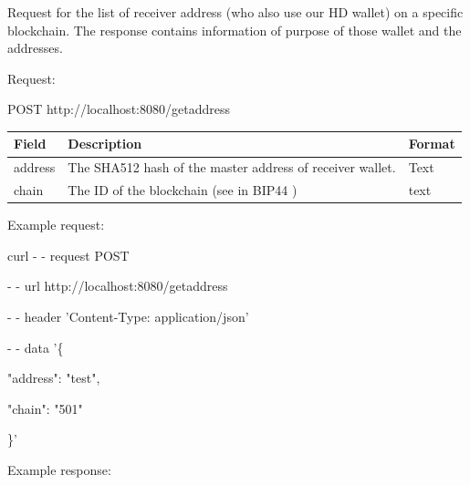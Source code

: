 Request for the list of receiver address (who also use our HD wallet) on a specific blockchain. The response contains information of purpose of those wallet and the addresses.

Request:

\begin{framed}
    POST http://localhost:8080/getaddress
\end{framed}

\begin{tabular}{| m{3cm} | m{9cm} | m{2.6cm} |}
    \hline
    Field & Description & Format                                            \\ \hline
    address & The SHA512 hash of the master address of receiver wallet. & Text   \\ \hline
    chain   & The ID of the blockchain (see in BIP44 \cite{bip44}) & text    \\ \hline
\end{tabular}
\bigskip

Example request:

\begin{framed}
\hspace*{13mm}    curl - - request POST \par
\hspace*{13mm}        - - url http://localhost:8080/getaddress \par
\hspace*{13mm}        - - header 'Content-Type: application/json' \par
\hspace*{13mm}        - - data '\{ \par
\hspace*{20mm}                "address": "test", \par
\hspace*{20mm}                "chain": "501" \par
\hspace*{20mm}            \}' \par
\end{framed}


Example response:

